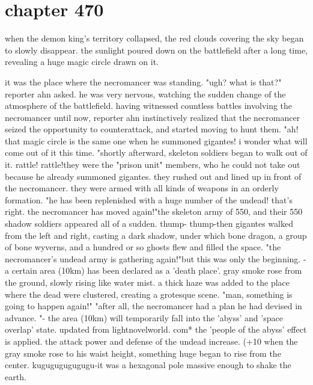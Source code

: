 \section{chapter 470}

when the demon king's territory collapsed, the red clouds covering the sky began to slowly disappear.
 the sunlight poured down on the battlefield after a long time, revealing a huge magic circle drawn on it.
 




it was the place where the necromancer was standing.
"ugh? what is that?" reporter ahn asked.
he was very nervous, watching the sudden change of the atmosphere of the battlefield.
 having witnessed countless battles involving the necromancer until now, reporter ahn instinctively realized that the necromancer seized the opportunity to counterattack, and started moving to hunt them.
 "ah! that magic circle is the same one when he summoned gigantes! i wonder what will come out of it this time.
"shortly afterward, skeleton soldiers began to walk out of it.
 rattle! rattle!they were the "prison unit" members, who he could not take out because he already summoned gigantes.
 they rushed out and lined up in front of the necromancer.
 they were armed with all kinds of weapons in an orderly formation.
"he has been replenished with a huge number of the undead! that's right.
 the necromancer has moved again!"the skeleton army of 550, and their 550 shadow soldiers appeared all of a sudden.
thump- thump-then gigantes walked from the left and right, casting a dark shadow, under which bone dragon, a group of bone wyverns, and a hundred or so ghosts flew and filled the space.
"the necromancer's undead army is gathering again!"but this was only the beginning.
- a certain area (10km) has been declared as a 'death place'.
gray smoke rose from the ground, slowly rising like water mist.
a thick haze was added to the place where the dead were clustered, creating a grotesque scene.
"man, something is going to happen again!"
"after all, the necromancer had a plan he had devised in advance.
"- the area (10km) will temporarily fall into the 'abyss' and 'space overlap' state.
updated from lightnovelworld.
com* the 'people of the abyss' effect is applied.
 the attack power and defense of the undead increase.
 (+10%
when the gray smoke rose to his waist height, something huge began to rise from the center.
kugugugugugugu-it was a hexagonal pole massive enough to shake the earth.
